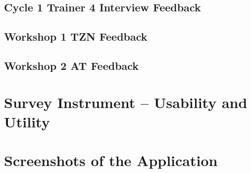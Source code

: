 \documentclass[12pt,a4paper,oneside]{report}
\begin{document}
\section{Cycle 1 Trainer 4 Interview Feedback}
\section{Workshop 1 TZN Feedback}
\section{Workshop 2 AT Feedback}

\chapter{Survey Instrument – Usability and Utility}

\chapter{Screenshots of the Application}
\end{document}
